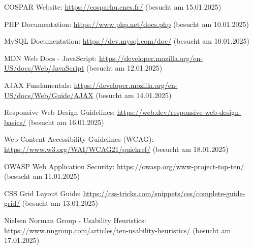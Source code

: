 \documentclass[11pt,a4paper]{article}
\begin{document}
\begin{thebibliography}{99}

COSPAR Website: \url{https://cosparhq.cnes.fr/} (besucht am 15.01.2025)

PHP Documentation: \url{https://www.php.net/docs.php} (besucht am 10.01.2025)

MySQL Documentation: \url{https://dev.mysql.com/doc/} (besucht am 10.01.2025)

MDN Web Docs - JavaScript: \url{https://developer.mozilla.org/en-US/docs/Web/JavaScript} (besucht am 12.01.2025)

AJAX Fundamentals: \url{https://developer.mozilla.org/en-US/docs/Web/Guide/AJAX} (besucht am 14.01.2025)

Responsive Web Design Guidelines: \url{https://web.dev/responsive-web-design-basics/} (besucht am 16.01.2025)

Web Content Accessibility Guidelines (WCAG): \url{https://www.w3.org/WAI/WCAG21/quickref/} (besucht am 18.01.2025)

OWASP Web Application Security: \url{https://owasp.org/www-project-top-ten/} (besucht am 11.01.2025)

CSS Grid Layout Guide: \url{https://css-tricks.com/snippets/css/complete-guide-grid/} (besucht am 13.01.2025)

Nielsen Norman Group - Usability Heuristics: \url{https://www.nngroup.com/articles/ten-usability-heuristics/} (besucht am 17.01.2025)

\end{thebibliography}
\end{document}
